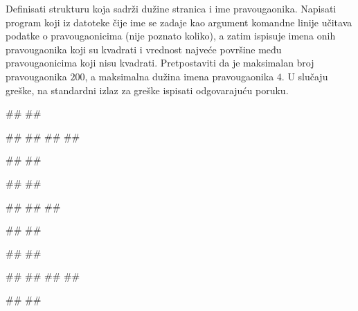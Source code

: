 \begin{Exercise}[label=p3_x1]         
Definisati strukturu  koja sadrži dužine stranica i ime pravougaonika.
Napisati program koji iz datoteke čije ime se zadaje kao argument komandne linije 
učitava podatke o pravougaonicima (nije poznato koliko), 
a zatim ispisuje imena onih pravougaonika koji su kvadrati i vrednost 
najveće površine među pravougaonicima koji nisu kvadrati.
Pretpostaviti da je maksimalan broj pravougaonika $200$, a maksimalna dužina imena pravougaonika $4$.
U slučaju greške, na standardni izlaz za greške ispisati odgovarajuću poruku.

\begin{minitest}
\begin{upotreba}{1}
#\naslovPokretanje#
##

##
##
##
##

#\naslovIzlaz#
##
\end{upotreba}
\end{minitest}
\begin{minitest}
\begin{upotreba}{2}
#\naslovPokretanje#
##

##
##
##

#\naslovIzlaz#
##
\end{upotreba}
\end{minitest}
\begin{minitest}
\begin{upotreba}{3}
#\naslovPokretanje#
##

##
##
##
##

#\naslovIzlaz#
##
\end{upotreba}
\end{minitest}

\end{Exercise}
\begin{Answer}[ref=p3_x1]
\newpage
\end{Answer}


